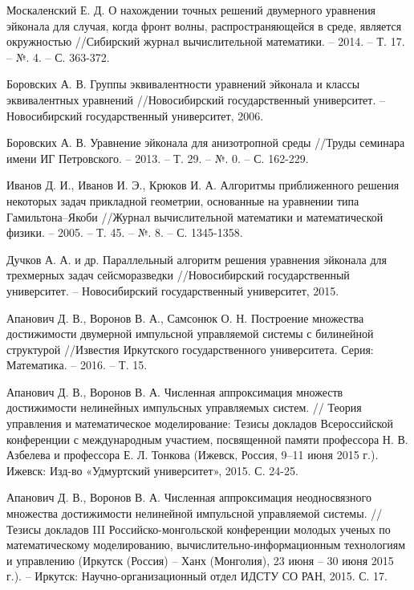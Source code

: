 \documentclass[a4paper,12pt]{article}
\begin{document}
\begin{thebibliography}{99}
Москаленский Е. Д. О нахождении точных решений
  двумерного уравнения эйконала для случая, когда фронт волны,
  распространяющейся в среде, является окружностью //Сибирский журнал
  вычислительной математики. – 2014. – Т. 17. – №. 4. – С. 363-372.

 Боровских А. В. Группы эквивалентности уравнений
  эйконала и классы эквивалентных уравнений //Новосибирский
  государственный университет. – Новосибирский государственный
  университет, 2006.

 Боровских А. В. Уравнение эйконала для анизотропной
  среды //Труды семинара имени ИГ Петровского. – 2013. – Т. 29. –
  №. 0. – С. 162-229.

 Иванов Д. И., Иванов И. Э., Крюков И. А. Алгоритмы
  приближенного решения некоторых задач прикладной геометрии,
  основанные на уравнении типа Гамильтона–Якоби //Журнал
  вычислительной математики и математической физики. – 2005. –
  Т. 45. – №. 8. – С. 1345-1358.

 Дучков А. А. и др. Параллельный алгоритм решения
  уравнения эйконала для трехмерных задач сейсморазведки
  //Новосибирский государственный университет. – Новосибирский
  государственный университет, 2015.
  
 Апанович Д. В., Воронов В. А., Самсонюк
  О. Н. Построение множества достижимости двумерной импульсной
  управляемой системы с билинейной структурой //Известия Иркутского
  государственного университета. Серия: Математика. – 2016. – Т. 15.

 Апанович Д. В., Воронов В. А. Численная аппроксимация
  множеств достижимости нелинейных импульсных управляемых систем. //
  Теория управления и математическое моделирование: Тезисы докладов
  Всероссийской конференции с международным участием, посвященной
  памяти профессора Н. В. Азбелева и профессора Е. Л. Тонкова (Ижевск,
  Россия, 9–11 июня 2015 г.). Ижевск: Изд-во «Удмуртский университет»,
  2015. С. 24-25.

 Апанович Д. В., Воронов В. А. Численная
  аппроксимация неодносвязного множества достижимости нелинейной
  импульсной управляемой системы. // Тезисы докладов III
  Российско-монгольской конференции молодых ученых по математическому
  моделированию, вычислительно-информационным технологиям и управлению
  (Иркутск (Россия) – Ханх (Монголия), 23 июня – 30 июня 2015 г.). –
  Иркутск: Научно-организационный отдел ИДСТУ СО РАН, 2015. С. 17.
  

\end{thebibliography}
\end{document}
